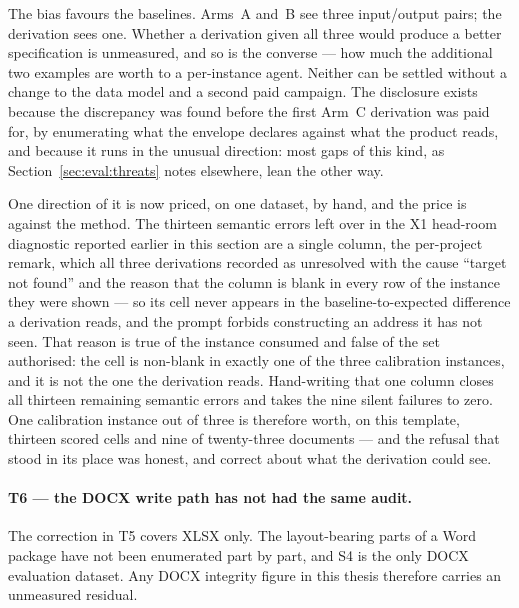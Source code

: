 The bias favours the baselines. Arms~A and~B see three input/output pairs; the derivation sees
one. Whether a derivation given all three would produce a better specification is unmeasured,
and so is the converse --- how much the additional two examples are worth to a per-instance
agent. Neither can be settled without a change to the data model and a second paid campaign.
The disclosure exists because the discrepancy was found before the first Arm~C derivation was
paid for, by enumerating what the envelope declares against what the product reads, and
because it runs in the unusual direction: most gaps of this kind, as
Section~\ref{sec:eval:threats} notes elsewhere, lean the other way.

One direction of it is now priced, on one dataset, by hand, and the price is against the method.
The thirteen semantic errors left over in the X1 head-room diagnostic reported earlier in this
section are a single column, the per-project remark, which all three derivations recorded as
unresolved with the cause ``target not found'' and the reason that the column is blank in every
row of the instance they were shown --- so its cell never appears in the baseline-to-expected
difference a derivation reads, and the prompt forbids constructing an address it has not seen.
That reason is true of the instance consumed and false of the set authorised: the cell is
non-blank in exactly one of the three calibration instances, and it is not the one the
derivation reads. Hand-writing that one column closes all thirteen remaining semantic errors
and takes the nine silent failures to zero. One calibration instance out of three is therefore
worth, on this template, thirteen scored cells and nine of twenty-three documents --- and the
refusal that stood in its place was honest, and correct about what the derivation could see.

\paragraph{T6 --- the DOCX write path has not had the same audit.}
The correction in T5 covers XLSX only. The layout-bearing parts of a Word package have not
been enumerated part by part, and S4 is the only DOCX evaluation dataset. Any DOCX integrity
figure in this thesis therefore carries an unmeasured residual.

